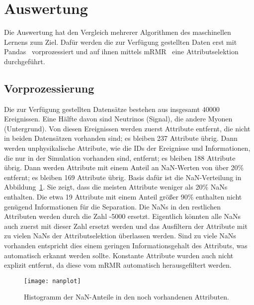 \section{Auswertung}
\label{sec:Auswertung}
Die Auswertung hat den Vergleich mehrerer Algorithmen des maschinellen Lernens zum Ziel.
Dafür werden die zur Verfügung gestellten Daten erst mit Pandas~\cite{pandas} vorprozessiert und auf ihnen mittels mRMR~\cite{mrmre} eine Attributselektion durchgeführt.

\subsection{Vorprozessierung}
Die zur Verfügung gestellten Datensätze bestehen aus insgesamt $\num{40000}$ Ereignissen.
Eine Hälfte davon sind Neutrinos (Signal), die andere Myonen (Untergrund).
Von diesen Ereignissen werden zuerst Attribute entfernt, die nicht in beiden Datensätzen vorhanden sind; es bleiben 237 Attribute übrig.
Dann werden unphysikalische Attribute, wie die IDs der Ereignisse und Informationen, die nur in der Simulation vorhanden sind, entfernt; es bleiben 188 Attribute übrig.
Dann werden Attribute mit einem Anteil an NaN-Werten von über 20\% entfernt; es bleiben 169 Attribute übrig.
Basis dafür ist die NaN-Verteilung in Abbildung~\ref{nanverteilung}.
Sie zeigt, dass die meisten Attribute weniger als 20\% NaNs enthalten.
Die etwa 19 Attribute mit einem Anteil größer 90\% enthalten nicht genügend Informationen für die Separation.
Die NaNs in den restlichen Attributen werden durch die Zahl -5000 ersetzt.
Eigentlich könnten alle NaNs auch zuerst mit dieser Zahl ersetzt werden und das Ausfiltern der Attribute mit zu vielen NaNs der Attributselektion überlassen werden.
Sind zu viele NaNs vorhanden entspricht dies einem geringen Informationsgehalt des Attributs, was automatisch erkannt werden sollte.
Konstante Attribute wurden auch nicht explizit entfernt, da diese vom mRMR automatisch herausgefiltert werden.
\begin{figure}
  \centering
  \texttt{[image: nanplot]}
\vspace{-1em}
  \caption{Histogramm der NaN-Anteile in den noch vorhandenen Attributen.}
  \label{nanverteilung}
\end{figure}



